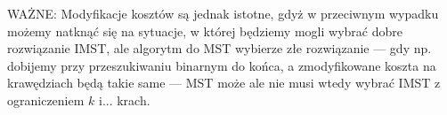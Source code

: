 \begin{itemize}
	
	WAŻNE: Modyfikacje kosztów są jednak istotne, gdyż w przeciwnym wypadku możemy natknąć się na sytuacje, w której będziemy mogli wybrać dobre rozwiązanie IMST, ale algorytm do MST wybierze złe rozwiązanie --- gdy np. dobijemy przy przeszukiwaniu binarnym do końca, a zmodyfikowane koszta na krawędziach będą takie same --- MST może ale nie musi wtedy wybrać IMST z ograniczeniem $k$ i... krach.
\end{itemize}